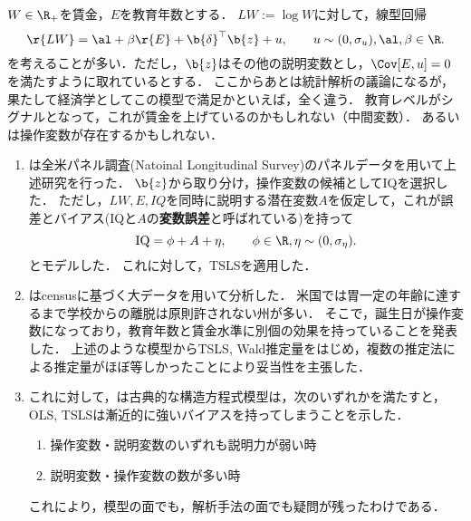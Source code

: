 \documentclass[uplatex,dvipdfmx]{jsreport}
\begin{document}
\begin{example}
    $W\in\R_+$を賃金，$E$を教育年数とする．
    $LW:=\log W$に対して，線型回帰
    \[\r{LW}=\al+\beta \r{E}+\b{\delta}^\top\b{z}+u,\qquad u\sim (0,\sigma_u),\al,\beta\in\R.\]
    を考えることが多い．ただし，$\b{z}$はその他の説明変数とし，$\Cov[E,u]=0$を満たすように取れているとする．
    ここからあとは統計解析の議論になるが，果たして経済学としてこの模型で満足かといえば，全く違う．
    教育レベルがシグナルとなって，これが賃金を上げているのかもしれない（中間変数）．
    あるいは操作変数が存在するかもしれない．
    \begin{enumerate}
        \item \cite{Griliches76}は全米パネル調査(Natoinal Longitudinal Survey)のパネルデータを用いて上述研究を行った．
        $\b{z}$から取り分け，操作変数の候補としてIQを選択した．
        ただし，$LW, E, IQ$を同時に説明する潜在変数$A$を仮定して，これが誤差とバイアス(IQと$A$の\textbf{変数誤差}と呼ばれている)を持って
        \[\mathrm{IQ}=\phi+A+\eta,\qquad\phi\in\R,\eta\sim(0,\sigma_\eta).\]
        とモデルした．
        これに対して，TSLSを適用した．
        \item \cite{Angrist-Krueger91}はcensusに基づく大データを用いて分析した．
        米国では胃一定の年齢に達するまで学校からの離脱は原則許されない州が多い．
        そこで，誕生日が操作変数になっており，教育年数と賃金水準に別個の効果を持っていることを発表した．
        上述のような模型からTSLS, Wald推定量をはじめ，複数の推定法による推定量がほぼ等しかったことにより妥当性を主張した．
        \item これに対して，\cite{Bound-Jaeger-Baker95}は古典的な構造方程式模型は，次のいずれかを満たすと，OLS, TSLSは漸近的に強いバイアスを持ってしまうことを示した．
        \begin{enumerate}
            \item 操作変数・説明変数のいずれも説明力が弱い時
            \item 説明変数・操作変数の数が多い時
        \end{enumerate}
        これにより，模型の面でも，解析手法の面でも疑問が残ったわけである．
    \end{enumerate}
\end{example}
\end{document}
